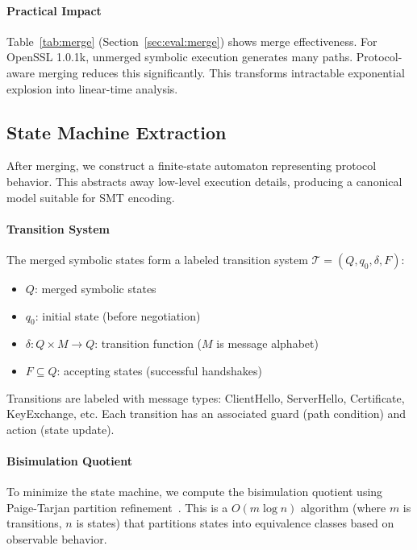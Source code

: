 \documentclass[10pt,twocolumn]{article}
\begin{document}
\paragraph{Practical Impact}
Table~\ref{tab:merge} (Section~\ref{sec:eval:merge}) shows merge effectiveness. For OpenSSL 1.0.1k, unmerged symbolic execution generates many paths. Protocol-aware merging reduces this significantly. This transforms intractable exponential explosion into linear-time analysis.

\subsection{State Machine Extraction}
\label{sec:statemachine}

After merging, we construct a finite-state automaton representing protocol behavior. This abstracts away low-level execution details, producing a canonical model suitable for SMT encoding.

\paragraph{Transition System}
The merged symbolic states form a labeled transition system $\mathcal{T} = (Q, q_0, \delta, F)$:
\begin{itemize}[leftmargin=*,noitemsep]
\item $Q$: merged symbolic states
\item $q_0$: initial state (before negotiation)
\item $\delta: Q \times M \rightarrow Q$: transition function ($M$ is message alphabet)
\item $F \subseteq Q$: accepting states (successful handshakes)
\end{itemize}

Transitions are labeled with message types: ClientHello, ServerHello, Certificate, KeyExchange, etc. Each transition has an associated guard (path condition) and action (state update).

\paragraph{Bisimulation Quotient}
To minimize the state machine, we compute the bisimulation quotient using Paige-Tarjan partition refinement~\cite{paige1987three}. This is a $O(m \log n)$ algorithm (where $m$ is transitions, $n$ is states) that partitions states into equivalence classes based on observable behavior.
\end{document}
